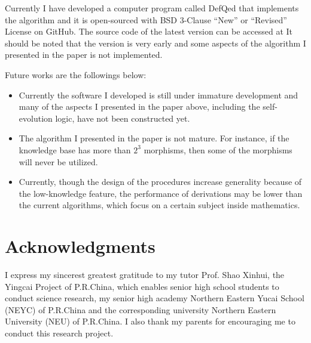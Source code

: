 \documentclass{article}
\begin{document}
Currently I have developed a computer program called DefQed that implements the algorithm and it is open-sourced with BSD 3-Clause {``}New{''} or {``}Revised{''} License on GitHub. The source code of the latest version can be accessed at \cite{7} It should be noted that the version is very early and some aspects of the algorithm I presented in the paper is not implemented.

Future works are the followings below:
\begin{itemize}
	\item {} Currently the software I developed is still under immature development and many of the aspects I presented in the paper above, including the self-evolution logic, have not been constructed yet.
	\item  {} The algorithm I presented in the paper is not mature. For instance, if the knowledge base has more than \(2^{3}\) morphisms, then some of the morphisms will never be utilized.
	\item {} Currently, though the design of the procedures increase generality because of the low-knowledge feature, the performance of derivations may be lower than the current algorithms, which focus on a certain subject inside mathematics.
\end{itemize}

\section*{Acknowledgments}
I express my sincerest greatest gratitude to my tutor Prof. Shao Xinhui, the Yingcai Project of P.R.China, which enables senior high school students to conduct science research, my senior high academy Northern Eastern Yucai School (NEYC) of P.R.China and the corresponding university Northern Eastern University (NEU) of P.R.China. I also thank my parents for encouraging me to conduct this research project.



\end{document}
